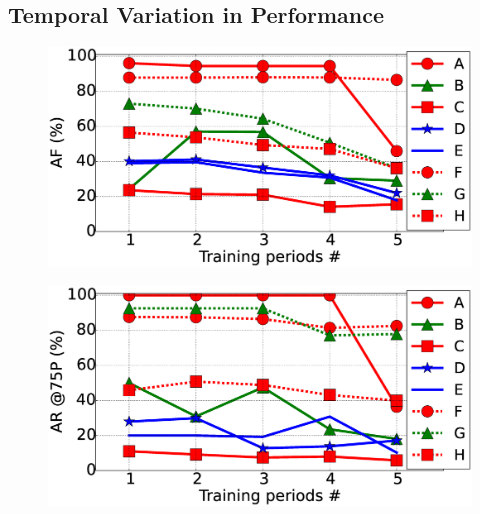 \subsection{Temporal Variation in Performance}
\begin{figure}
\centering
\begin{minipage}{.48\textwidth}
  \centering
  \includegraphics[width=0.95\linewidth]{FileAccess/figs/VaryTrainFScore10}
  \label{fig:varytrainFscore}
\end{minipage} %
\begin{minipage}{.48\textwidth}
  \centering
  \includegraphics[width=0.95\linewidth]{FileAccess/figs/VaryTrainR7510}
  \label{fig:varytrainR75}
\end{minipage}
\end{figure}
